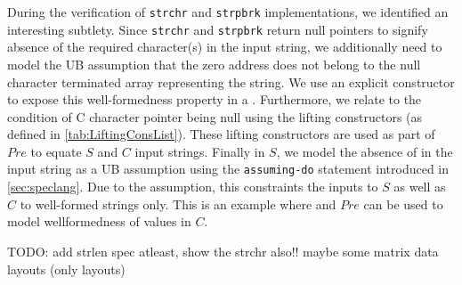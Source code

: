 During the verification of {\tt strchr} and {\tt strpbrk} implementations,
we identified an interesting subtlety. Since {\tt strchr} and {\tt strpbrk}
return null pointers to signify absence of the required character(s) in the input string,
we additionally need to model the UB assumption that the zero
address does not belong to the null character terminated array representing the string.
We use an explicit constructor  to expose this well-formedness property in a \SpecL{} .
Furthermore, we relate  to the condition of C character pointer being null using the
lifting constructors  (as defined in \cref{tab:LiftingConsList}).
These lifting constructors are used as part of $Pre$ to equate $S$ and $C$ input strings.
Finally in $S$, we model the absence of  in the input string as a UB assumption using
the {\tt assuming-do} statement introduced in \cref{sec:speclang}.
Due to the \sdef{} assumption, this constraints the inputs to $S$ as well as $C$ to well-formed strings only.
This is an example where \sdef{} and $Pre$ can be used to model wellformedness of values in $C$.

TODO: add strlen spec atleast, show the strchr also!! maybe some matrix data layouts (only layouts)
